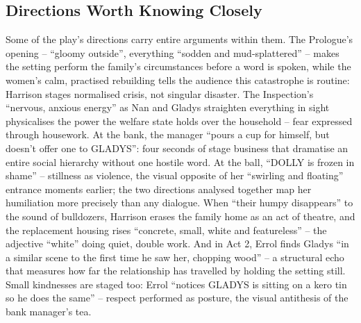 \documentclass[a4paper]{article}
\begin{document}
\subsection{Directions Worth Knowing Closely}
Some of the play's directions carry entire arguments within them. The Prologue's opening -- ``gloomy outside'', everything ``sodden and mud-splattered'' -- makes the setting perform the family's circumstances before a word is spoken, while the women's calm, practised rebuilding tells the audience this catastrophe is routine: Harrison stages normalised crisis, not singular disaster. The Inspection's ``nervous, anxious energy'' as Nan and Gladys straighten everything in sight physicalises the power the welfare state holds over the household -- fear expressed through housework. At the bank, the manager ``pours a cup for himself, but doesn't offer one to GLADYS'': four seconds of stage business that dramatise an entire social hierarchy without one hostile word. At the ball, ``DOLLY is frozen in shame'' -- stillness as violence, the visual opposite of her ``swirling and floating'' entrance moments earlier; the two directions analysed together map her humiliation more precisely than any dialogue. When ``their humpy disappears'' to the sound of bulldozers, Harrison erases the family home as an act of theatre, and the replacement housing rises ``concrete, small, white and featureless'' -- the adjective ``white'' doing quiet, double work. And in Act 2, Errol finds Gladys ``in a similar scene to the first time he saw her, chopping wood'' -- a structural echo that measures how far the relationship has travelled by holding the setting still. Small kindnesses are staged too: Errol ``notices GLADYS is sitting on a kero tin so he does the same'' -- respect performed as posture, the visual antithesis of the bank manager's tea.\\
\end{document}
